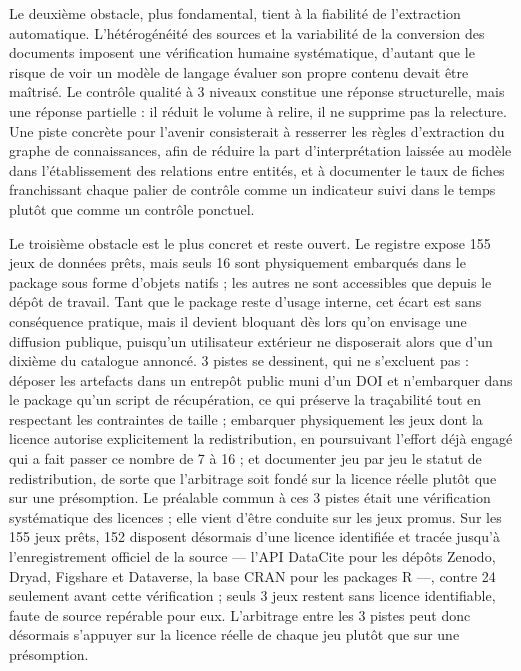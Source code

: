 \documentclass[11pt,a4paper]{article}
\begin{document}
Le deuxième obstacle, plus fondamental, tient à la fiabilité de l'extraction automatique. L'hétérogénéité des sources et la variabilité de la conversion des documents imposent une vérification humaine systématique, d'autant que le risque de voir un modèle de langage évaluer son propre contenu devait être maîtrisé. Le contrôle qualité à 3 niveaux constitue une réponse structurelle, mais une réponse partielle : il réduit le volume à relire, il ne supprime pas la relecture. Une piste concrète pour l'avenir consisterait à resserrer les règles d'extraction du graphe de connaissances, afin de réduire la part d'interprétation laissée au modèle dans l'établissement des relations entre entités, et à documenter le taux de fiches franchissant chaque palier de contrôle comme un indicateur suivi dans le temps plutôt que comme un contrôle ponctuel.

Le troisième obstacle est le plus concret et reste ouvert. Le registre expose 155 jeux de données prêts, mais seuls 16 sont physiquement embarqués dans le package sous forme d'objets natifs ; les autres ne sont accessibles que depuis le dépôt de travail. Tant que le package reste d'usage interne, cet écart est sans conséquence pratique, mais il devient bloquant dès lors qu'on envisage une diffusion publique, puisqu'un utilisateur extérieur ne disposerait alors que d'un dixième du catalogue annoncé. 3 pistes se dessinent, qui ne s'excluent pas : déposer les artefacts dans un entrepôt public muni d'un DOI et n'embarquer dans le package qu'un script de récupération, ce qui préserve la traçabilité tout en respectant les contraintes de taille ; embarquer physiquement les jeux dont la licence autorise explicitement la redistribution, en poursuivant l'effort déjà engagé qui a fait passer ce nombre de 7 à 16 ; et documenter jeu par jeu le statut de redistribution, de sorte que l'arbitrage soit fondé sur la licence réelle plutôt que sur une présomption. Le préalable commun à ces 3 pistes était une vérification systématique des licences ; elle vient d'être conduite sur les jeux promus. Sur les 155 jeux prêts, 152 disposent désormais d'une licence identifiée et tracée jusqu'à l'enregistrement officiel de la source --- l'API DataCite pour les dépôts Zenodo, Dryad, Figshare et Dataverse, la base CRAN pour les packages R ---, contre 24 seulement avant cette vérification ; seuls 3 jeux restent sans licence identifiable, faute de source repérable pour eux. L'arbitrage entre les 3 pistes peut donc désormais s'appuyer sur la licence réelle de chaque jeu plutôt que sur une présomption.
\end{document}
